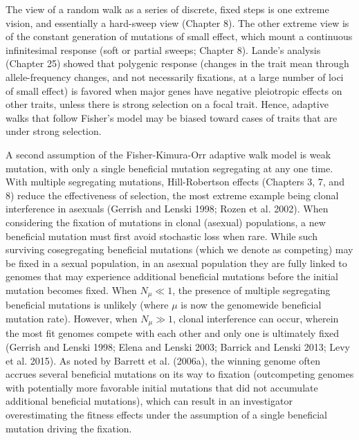 \documentclass{article}
\begin{document}
The view of a random walk as a series of discrete, fixed steps is one extreme vision, and essentially a hard-sweep view (Chapter 8). The other extreme view is of the constant generation of mutations of small effect, which mount a continuous infinitesimal response (soft or partial sweeps; Chapter 8). Lande's analysis (Chapter 25) showed that polygenic response (changes in the trait mean through allele-frequency changes, and not necessarily fixations, at a large number of loci of small effect) is favored when major genes have negative pleiotropic effects on other traits, unless there is strong selection on a focal trait. Hence, adaptive walks that follow Fisher's model may be biased toward cases of traits that are under strong selection.

A second assumption of the Fisher-Kimura-Orr adaptive walk model is weak mutation, with only a single beneficial mutation segregating at any one time. With multiple segregating mutations, Hill-Robertson effects (Chapters 3, 7, and 8) reduce the effectiveness of selection, the most extreme example being clonal interference in asexuals (Gerrish and Lenski 1998; Rozen et al. 2002). When considering the fixation of mutations in clonal (asexual) populations, a new beneficial mutation must first avoid stochastic loss when rare. While such surviving cosegregating beneficial mutations (which we denote as competing) may be fixed in a sexual population, in an asexual population they are fully linked to genomes that may experience additional beneficial mutations before the initial mutation becomes fixed. When  $ N_{\mu} \ll 1 $, the presence of multiple segregating beneficial mutations is unlikely (where  $ \mu $ is now the genomewide beneficial mutation rate). However, when  $ N_{\mu} \gg 1 $, clonal interference can occur, wherein the most fit genomes compete with each other and only one is ultimately fixed (Gerrish and Lenski 1998; Elena and Lenski 2003; Barrick and Lenski 2013; Levy et al. 2015). As noted by Barrett et al. (2006a), the winning genome often accrues several beneficial mutations on its way to fixation (outcompeting genomes with potentially more favorable initial mutations that did not accumulate additional beneficial mutations), which can result in an investigator overestimating the fitness effects under the assumption of a single beneficial mutation driving the fixation.
\end{document}
